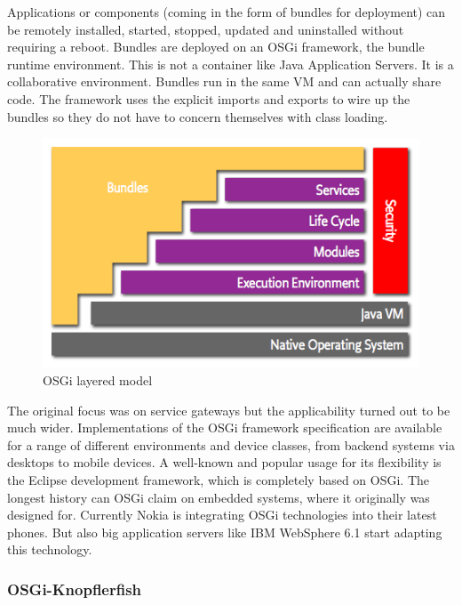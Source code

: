 Applications or components (coming in the form of bundles for deployment) can
be remotely installed, started, stopped, updated and uninstalled without requiring a reboot. 
Bundles are deployed on an OSGi framework, the bundle runtime environment. 
This is not a container like Java Application Servers. It is a collaborative environment. 
Bundles run in the same VM and can actually share code. 
The framework uses the explicit imports and exports to wire up the bundles so they do not have 
to concern themselves with class loading.

\begin{figure}
 \begin{center}
 \includegraphics[scale=0.5]{img/layering-osgi.png}
 \end{center}
 \caption{\label{img:osgi}OSGi layered model}
\end{figure}

The original focus was on service gateways but the applicability turned out to be much wider. 
Implementations of the OSGi framework specification are available for a range of different 
environments and device classes, from backend systems via desktops to mobile devices. 
A well-known and popular usage for its flexibility is the Eclipse development framework, 
which is completely based on OSGi. The longest history can OSGi claim on embedded systems, 
where it originally was designed for. Currently Nokia is integrating OSGi technologies into 
their latest phones. 
But also big application servers like IBM WebSphere 6.1 start adapting this technology.

\subsubsection{OSGi-Knopflerfish}
\label{subsubsec:tech-osgi-knopflerfish}

